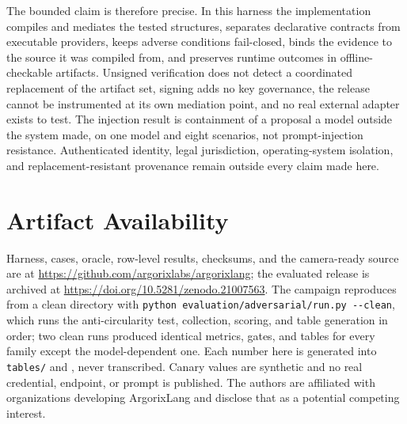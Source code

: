 \documentclass[conference]{IEEEtran}
\begin{document}
The bounded claim is therefore precise.  In this harness the implementation
compiles and mediates the tested structures, separates declarative contracts
from executable providers, keeps adverse conditions fail-closed, binds the
evidence to the source it was compiled from, and preserves runtime outcomes in
offline-checkable artifacts.  Unsigned verification does not detect a coordinated
replacement of the artifact set, signing adds no key governance, the release
cannot be instrumented at its own mediation point, and no real external adapter
exists to test.  The injection result is containment of a proposal a model
outside the system made, on one model and eight scenarios, not
prompt-injection resistance.  Authenticated identity, legal jurisdiction,
operating-system isolation, and replacement-resistant provenance remain outside
every claim made here.

\section*{Artifact Availability}

Harness, cases, oracle, row-level results, checksums, and the camera-ready
source are at \url{https://github.com/argorixlabs/argorixlang}; the evaluated
release is archived at \url{https://doi.org/10.5281/zenodo.21007563}.  The
campaign reproduces from a clean directory with
\texttt{python evaluation/adversarial/run.py -{}-clean}, which runs the
anti-circularity test, collection, scoring, and table generation in order; two
clean runs produced identical metrics, gates, and tables for every family
except the model-dependent one.  Each number here is generated into
\texttt{tables/} and \verb||, never transcribed.  Canary values are
synthetic and no real credential, endpoint, or prompt is published.  The
authors are affiliated with organizations developing ArgorixLang and disclose
that as a potential competing interest.



\end{document}
